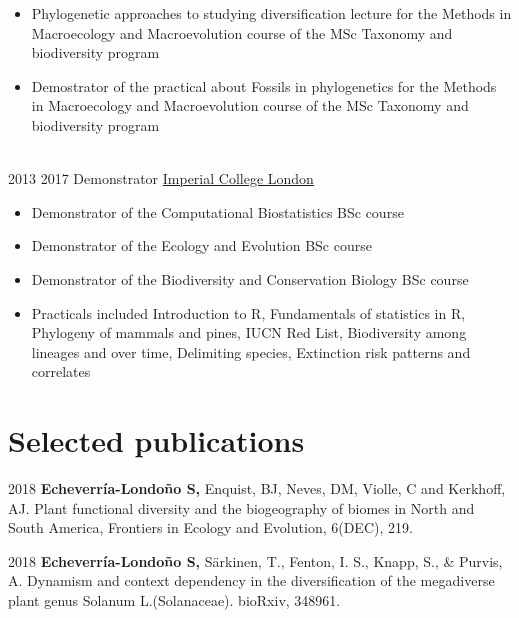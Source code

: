 \documentclass[letterpaper]{twentysecondcv} %
\begin{document}
\begin{twenty}
{{\begin{itemize}
        \item Phylogenetic approaches to studying diversification lecture for the Methods in Macroecology and Macroevolution course of the MSc Taxonomy and biodiversity program
        \item Demostrator of the practical about Fossils in phylogenetics for the Methods in Macroecology and Macroevolution course of the MSc Taxonomy and biodiversity program
    \end{itemize}}
	}
    \\   
	\twentyitem
	{2013}
	{2017}
	{Demonstrator}
	{\href{https://www.imperial.ac.uk/}{Imperial College London}}
	{}
	{
	 {\begin{itemize}
		\item Demonstrator of the Computational Biostatistics BSc course
		\item Demonstrator of the Ecology and Evolution BSc course
		\item Demonstrator of the Biodiversity and Conservation Biology BSc course
		\item Practicals included Introduction to R, Fundamentals of statistics in R, Phylogeny of mammals and pines, IUCN Red List, Biodiversity among lineages and over time, Delimiting species, Extinction risk patterns and correlates
		
	\end{itemize}}
    	}
        
\end{twenty}


\section{Selected publications}

2018 \textbf{Echeverr\'ia-Londo\~no S,} Enquist, BJ, Neves, DM, Violle, C and Kerkhoff, AJ.  Plant functional diversity and the biogeography of biomes in North and South America, Frontiers in Ecology and Evolution, 6(DEC), 219.

2018 \textbf{Echeverr\'ia-Londo\~no S,}  S{\"a}rkinen, T., Fenton, I. S., Knapp, S., \& Purvis, A. Dynamism and context dependency in the diversification of the megadiverse plant genus Solanum L.(Solanaceae). bioRxiv, 348961.
\end{document}
